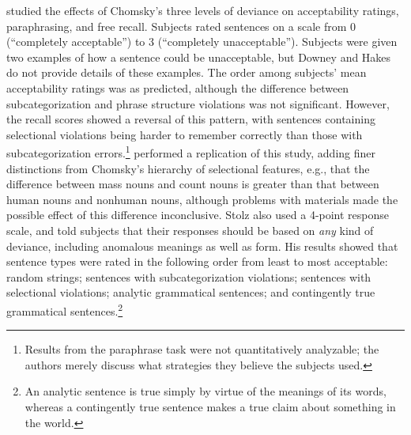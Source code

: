 \citet{DowneyEtAl1968} studied the effects of Chomsky's three levels of deviance on acceptability ratings, paraphrasing, and free recall. Subjects rated sentences on a scale from 0 (``completely acceptable'') to 3 (``completely unacceptable''). Subjects were given two examples of how a sentence could be unacceptable, but Downey and Hakes do not provide details of these examples. The order among subjects' mean acceptability ratings was as predicted, although the difference between subcategorization and phrase structure violations was not significant. However, the recall scores showed a reversal of this pattern, with sentences containing selectional violations being harder to remember correctly than those with subcategorization errors.\footnote{Results from the paraphrase task were not quantitatively analyzable; the authors merely discuss what strategies they believe the subjects used.}
 \citet{Stolz1969} performed a replication of this study, adding finer distinctions from Chomsky's hierarchy of selectional features, e.g., that the difference between mass nouns and count nouns is greater than that between human nouns and nonhuman nouns, although problems with materials made the possible effect of this difference inconclusive. Stolz also used a 4-point response scale, and told subjects that their responses should be based on \textit{any} kind of deviance, including anomalous meanings as well as form. His results showed that sentence types were rated in the following order from least to most acceptable: random strings; sentences with subcategorization violations; sentences with selectional violations; analytic  grammatical sentences; and contingently true grammatical sentences.\footnote{ An analytic sentence is true simply by virtue of the meanings of its words, whereas a contingently true sentence makes a true claim about something in the world.
}



